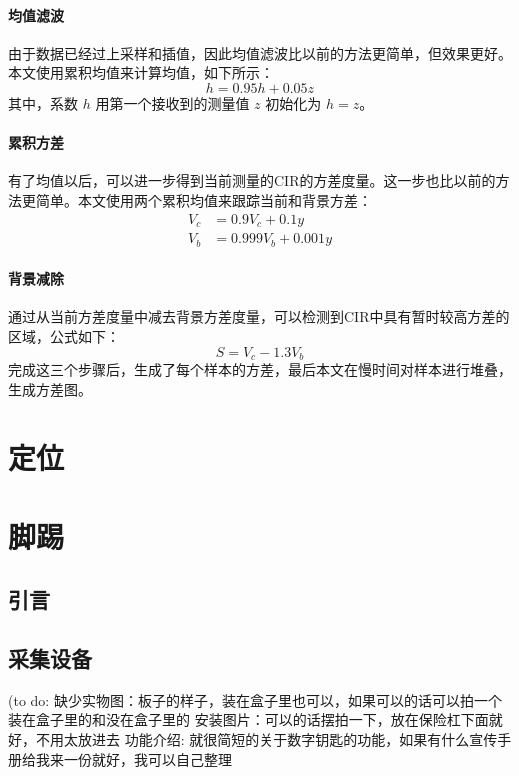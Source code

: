\subsubsection{均值滤波}
由于数据已经过上采样和插值，因此均值滤波比以前\cite{Ledergerber}的方法更简单，但效果更好。本文使用累积均值来计算均值，如下所示：
\begin{equation}
    h = 0.95h + 0.05z
\end{equation}
其中，系数 \( h \) 用第一个接收到的测量值 \( z \) 初始化为 \( h = z \)。

\subsubsection{累积方差}
有了均值以后，可以进一步得到当前测量的CIR的方差度量。这一步也比以前\cite{Ledergerber}的方法更简单。本文使用两个累积均值来跟踪当前和背景方差：
\begin{align}
    V_c &= 0.9V_c + 0.1y \\
    V_b &= 0.999V_b + 0.001y
\end{align}

\subsubsection{背景减除}
通过从当前方差度量中减去背景方差度量，可以检测到CIR中具有暂时较高方差的区域，公式如下：
\begin{equation}
    S = V_c - 1.3V_b
\end{equation}
完成这三个步骤后，生成了每个样本的方差，最后本文在慢时间对样本进行堆叠，生成方差图。


\chapter{定位}

\chapter{脚踢}

\section{引言}
\section{采集设备}
(to do: 
缺少实物图：板子的样子，装在盒子里也可以，如果可以的话可以拍一个装在盒子里的和没在盒子里的
安装图片：可以的话摆拍一下，放在保险杠下面就好，不用太放进去
功能介绍: 就很简短的关于数字钥匙的功能，如果有什么宣传手册给我来一份就好，我可以自己整理

